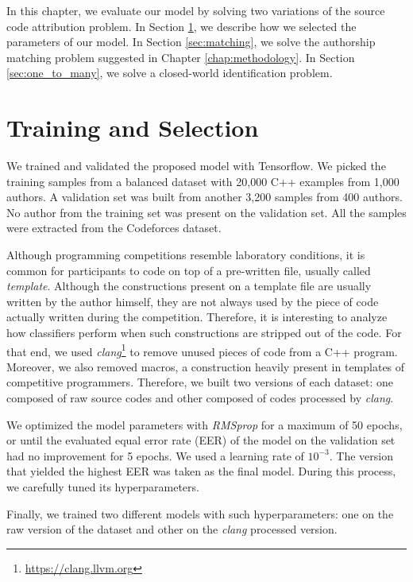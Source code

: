 \label{chap:evaluation}

In this chapter, we evaluate our model by solving two variations of the source code attribution problem. In Section \ref{sec:validation}, we describe how we selected the parameters of our model. In Section \ref{sec:matching}, we solve the authorship matching problem suggested in Chapter \ref{chap:methodology}. In Section \ref{sec:one_to_many}, we solve a closed-world identification problem.

\section{Training and Selection}\label{sec:validation}

We trained and validated the proposed model with Tensorflow. We picked the training samples from a balanced dataset with 20,000 C++ examples from 1,000 authors. A validation set was built from another 3,200 samples from 400 authors. No author from the training set was present on the validation set. All the samples were extracted from the Codeforces dataset.

Although programming competitions resemble laboratory conditions, it is common for participants to code on top of a pre-written file, usually called \textit{template}. Although the constructions present on a template file are usually written by the author himself, they are not always used by the piece of code actually written during the competition. Therefore, it is interesting to analyze how classifiers perform when such constructions are stripped out of the code. For that end, we used \textit{clang}\footnote{\url{https://clang.llvm.org}} to remove unused pieces of code from a C++ program. Moreover, we also removed macros, a construction heavily present in templates of competitive programmers. Therefore, we built two versions of each dataset: one composed of raw source codes and other composed of codes processed by \textit{clang}.

We optimized the model parameters with \textit{RMSprop} \cite{rmsprop} for a maximum of 50 epochs, or until the evaluated equal error rate (EER) of the model on the validation set had no improvement for 5 epochs. We used a learning rate of $10^{-3}$. The version that yielded the highest EER was taken as the final model. During this process, we carefully tuned its hyperparameters.

Finally, we trained two different models with such hyperparameters: one on the raw version of the dataset and other on the \textit{clang} processed version.

